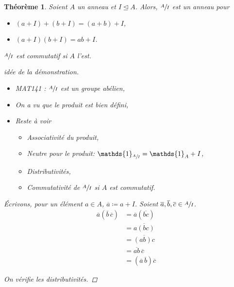 \documentclass{report}
\newtheorem*{thm}{Th\'eor\`eme}
\theoremstyle{definition}
\theoremstyle{remark}
\newenvironment*{subsubproof}[1][D\'emonstration]
{
\begin{proof}[#1]

}
{
\renewcommand{\qedsymbol}{\#}
\end{proof}
\renewcommand{\qedsymbol}{$\square$}
}
\def\id{\mathds{1}}
\begin{document}
	\begin{thm}
		Soient $A$ un anneau et $I\trianglelefteq A$. Alors, $\sfrac{A}{I}$ est un anneau pour
		\begin{itemize}
			\item $(a+I)+(b+I)=(a+b)+I$,
			\item $(a+I)(b+I)=ab+I$.
		\end{itemize}

		$\sfrac{A}{I}$ est commutatif si $A$ l'est.

		\begin{subsubproof}[id\'ee de la d\'emonstration]~

			\begin{itemize}
				\item MAT141 : $\sfrac{A}{I}$ est un groupe ab\'elien,
				\item On a vu que le produit est bien d\'efini,
				\item Reste \`a voir
				\begin{itemize}
					\item Associativit\'e du produit,
					\item Neutre pour le produit: $\id_{\sfrac{A}{I}}=\id_A+I$,
					\item Distributivit\'es,
					\item Commutativit\'e de $\sfrac{A}{I}$ si $A$ est commutatif.
				\end{itemize}
			\end{itemize}

			\'Ecrivons, pour un \'el\'ement $a\in A$, $\overline{a} \coloneq a+I$. Soient $\overline{a}, \overline{b}, \overline{c} \in \sfrac{A}{I}$.
			\begin{align*}
				\overline{a}(\overline{b}\,\overline{c})&= \overline{a}(\overline{bc})\\
				&= \overline{a(bc)}\\
				&= \overline{(ab)c}\\
				&= \overline{ab}\,\overline{c}\\
				&= (\overline{a}\,\overline{b})\overline{c}
			\end{align*}

			On v\'erifie les distributivit\'es.
		\end{subsubproof}
	\end{thm}
\end{document}
